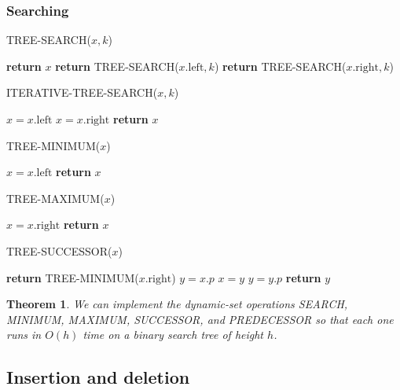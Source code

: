 \documentclass[12pt]{article}
\newtheorem{theorem}{Theorem}
\begin{document}
\subsubsection*{Searching}

TREE-SEARCH($x, k$)
\begin{algorithmic}[1]
	\State \textbf {return} $x$
\EndIf
{}
	\State \textbf {return} TREE-SEARCH($x.\text{left}, k$)
\Else
	\State \textbf {return} TREE-SEARCH($x.\text{right}, k$)
\EndIf
\end{algorithmic}

ITERATIVE-TREE-SEARCH($x, k$)
\begin{algorithmic}[1]
		\State $x = x.\text{left}$
        \Else
		\State $x = x.\text{right}$
	\EndIf
\EndWhile
\State \textbf {return} $x$
\end{algorithmic}

TREE-MINIMUM($x$)
\begin{algorithmic}[1]
	\State $x = x.\text{left}$
\EndWhile
\State \textbf {return} $x$
\end{algorithmic}

TREE-MAXIMUM($x$)
\begin{algorithmic}[1]
	\State $x = x.\text{right}$
\EndWhile
\State \textbf {return} $x$
\end{algorithmic}

TREE-SUCCESSOR($x$)
\begin{algorithmic}[1]
	\State \textbf {return} TREE-MINIMUM($x.\text{right}$)
\EndIf
\State $y = x.p$
	\State $x = y$
        \State $y = y.p$
\EndWhile
\State \textbf {return} $y$
\end{algorithmic}

\begin{theorem}
  We can implement the dynamic-set operations SEARCH, MINIMUM, MAXIMUM, SUCCESSOR, and PREDECESSOR so that each one runs in $O(h)$ time on a binary search tree of height $h$.
\end{theorem}

\subsection{Insertion and deletion}
\end{document}

